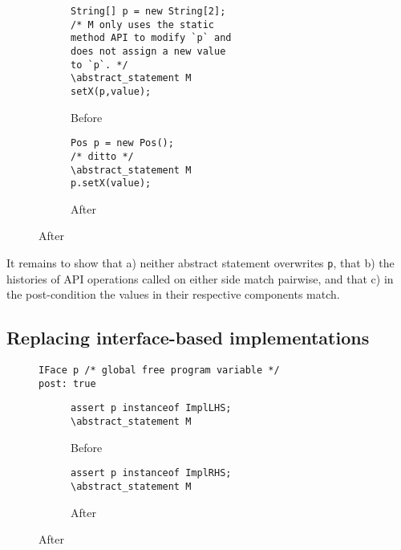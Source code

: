 \begin{figure}
  \begin{subfigure}[b]{.45\linewidth} 
    \begin{lstlisting}[style=smallJava]
String[] p = new String[2];
/* M only uses the static
method API to modify `p` and
does not assign a new value
to `p`. */
\abstract_statement M
setX(p,value);
    \end{lstlisting}
    \caption{Before}
    \label{lst:ArrayBefore}
  \end{subfigure}\hspace{1cm}
  \begin{subfigure}[b]{.45\linewidth}
        \begin{lstlisting}[style=smallJava]
Pos p = new Pos();
/* ditto */
\abstract_statement M
p.setX(value);
    \end{lstlisting}
    \caption{After}
    \label{lst:ArrayAfter}
  \end{subfigure}
  \label{lst:ReplaceArray-REF}
\end{figure}

It remains to show that a) neither abstract statement overwrites \texttt{p}, that b) the histories of API operations called on either side match pairwise,
and that c) in the post-condition the values in their respective components match.


\subsection*{Replacing interface-based implementations}

\begin{figure}
      \begin{lstlisting}[style=smallJava]
IFace p /* global free program variable */
post: true
    \end{lstlisting}

  \begin{subfigure}[h]{.45\linewidth} 
    \begin{lstlisting}[style=smallJava]
assert p instanceof ImplLHS;
\abstract_statement M
    \end{lstlisting}
    \caption{Before}
    \label{lst:IFaceBefore}
  \end{subfigure}\hfill
  \begin{subfigure}[h]{.45\linewidth}
        \begin{lstlisting}[style=smallJava]
assert p instanceof ImplRHS;
\abstract_statement M
    \end{lstlisting}
    \caption{After}
    \label{lst:iFaceAfter}
  \end{subfigure}
  \label{lst:refa-ibased}
\end{figure}

